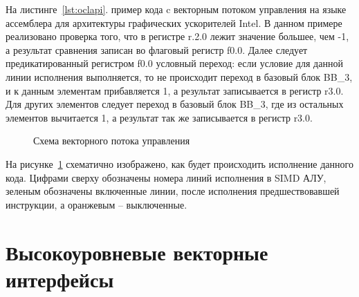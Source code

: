 На листинге~\cref{lst:oclapi}. пример кода c векторным потоком управления на языке ассемблера для архитектуры графических ускорителей Intel. В данном примере реализовано проверка того, что в регистре r.2.0 лежит значение большее, чем -1, а результат сравнения записан во флаговый регистр f0.0. Далее следует предикатированный регистром f0.0 условный переход: если условие для данной линии исполнения выполняется, то не происходит переход в базовый блок BB\_3, и к данным элементам прибавляется 1, а результат записывается в регистр r3.0. Для других элементов следует переход в базовый блок BB\_3, где из остальных элементов вычитается 1, а результат так же записывается в регистр r3.0.

\begin{figure}[ht]
    \caption{Схема векторного потока управления}\label{fig:HW-goto-example}
\end{figure}

На рисунке~\ref{fig:HW-goto-example} схематично изображено, как будет происходить исполнение данного кода. Цифрами сверху обозначены номера линий исполнения в SIMD АЛУ, зеленым обозначены включенные линии, после исполнения предшествовавшей инструкции, а оранжевым -- выключенные.

\section{Высокоуровневые векторные интерфейсы}\label{sec:overview/vectorapi}

